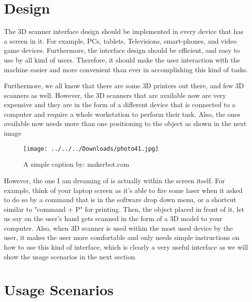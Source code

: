 \documentclass[12pt, oneside]{amsart}   	%
\begin{document}
\section{Design}

The 3D scanner interface design should be implemented in every device that has a screen in it.  For example, PCs, tablets, Televisions, smart-phones, and video game devices. Furthermore, the interface design should be efficient, and easy to use by all kind of users. Therefore, it should make the user interaction with the machine easier and more convenient than ever in accomplishing this kind of tasks. 

Furthermore, we all know that there are some 3D printers out there, and few 3D scanners as well.  However, the 3D scanners that are available now are very expensive and they are in the form of a different device that is connected to a computer and require a whole workstation to perform their task.  Also, the ones available now needs more than one positioning to the object as shown in the next image

\begin{figure}[ht!]
\centering
\texttt{[image: ../../../Downloads/photo41.jpg]}
\caption{A simple caption by: makerbot.com}
\label{overflow}
\end{figure}


  However, the one I am dreaming of is actually within the screen itself.  For example, think of your laptop screen as it's able to fire some laser when it asked to do so by a command that is in the software drop down menu, or a shortcut similar to "command + P" for printing. Then, the object placed in front of it, let us say on the user's hand gets scanned in the form of a 3D model to your computer. Also, when 3D scanner is used within the most used device by the user, it makes the user more comfortable and only needs simple instructions on how to use this kind of interface, which is clearly a very useful interface as we will show the usage scenarios in the next section.
\section{Usage Scenarios}
\end{document}
